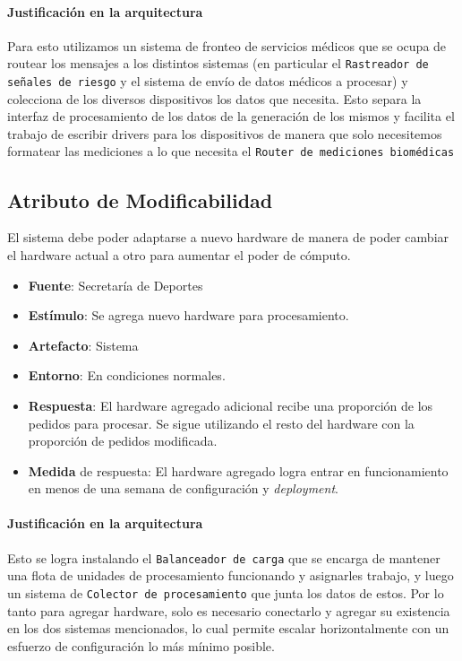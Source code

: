 \paragraph{Justificación en la arquitectura}

Para esto utilizamos un sistema de fronteo de servicios médicos que se ocupa de routear los mensajes a los
distintos sistemas (en particular el \texttt{Rastreador de señales de riesgo} y el sistema de envío de datos
médicos a procesar) y colecciona de los diversos dispositivos los datos que necesita. Esto separa la interfaz
de procesamiento de los datos de la generación de los mismos y facilita el trabajo de escribir drivers para los
dispositivos de manera que solo necesitemos formatear las mediciones a lo que necesita el \texttt{Router de
mediciones biomédicas}

\subsection{Atributo de Modificabilidad}
El sistema debe poder adaptarse a nuevo hardware de manera de poder cambiar el hardware actual a otro para aumentar el poder de cómputo.

\begin{itemize}
  \item \textbf{Fuente}: Secretaría de Deportes
  \item \textbf{Estímulo}: Se agrega nuevo hardware para procesamiento.
  \item \textbf{Artefacto}: Sistema
  \item \textbf{Entorno}: En condiciones normales.
  \item \textbf{Respuesta}: El hardware agregado adicional recibe una proporción de los pedidos para procesar. Se sigue utilizando el resto del hardware con la proporción de pedidos modificada.
  \item \textbf{Medida} de respuesta: El hardware agregado logra entrar en funcionamiento en menos de una semana de configuración y \emph{deployment}.
\end{itemize}

\paragraph{Justificación en la arquitectura}

Esto se logra instalando el \texttt{Balanceador de carga} que se encarga de mantener una flota de unidades de
procesamiento funcionando y asignarles trabajo, y luego un sistema de \texttt{Colector de procesamiento} que
junta los datos de estos. Por lo tanto para agregar hardware, solo es necesario conectarlo y agregar su 
existencia en los dos sistemas mencionados, lo cual permite escalar horizontalmente con un esfuerzo de 
configuración lo más mínimo posible.

